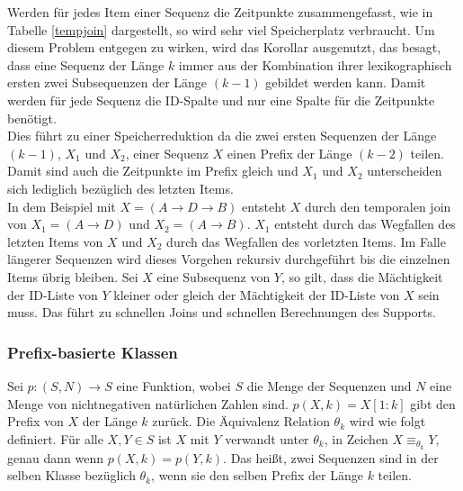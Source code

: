 Werden für jedes Item einer Sequenz die Zeitpunkte zusammengefasst, wie in Tabelle \ref{tempjoin} dargestellt, so wird sehr viel Speicherplatz verbraucht. Um diesem Problem entgegen zu wirken, wird das Korollar ausgenutzt, das besagt, dass eine Sequenz der Länge $k$ immer aus der Kombination ihrer lexikographisch ersten zwei Subsequenzen der Länge $(k-1)$ gebildet werden kann. Damit werden für jede Sequenz die ID-Spalte und nur eine Spalte für die Zeitpunkte benötigt.\\
Dies führt zu einer Speicherreduktion da die zwei ersten Sequenzen der Länge $(k-1)$, $X_1$ und $X_2$, einer Sequenz $X$ einen Prefix der Länge $(k-2)$ teilen. Damit sind auch die Zeitpunkte im Prefix gleich und $X_1$ und $X_2$ unterscheiden sich lediglich bezüglich des letzten Items.\\
In dem Beispiel mit $X=(A\rightarrow D\rightarrow B)$ entsteht $X$ durch den temporalen join von $X_1=(A\rightarrow D)$ und $X_2=(A\rightarrow B)$. $X_1$ entsteht durch das Wegfallen des letzten Items von $X$ und $X_2$ durch das Wegfallen des vorletzten Items. Im Falle längerer Sequenzen wird dieses Vorgehen rekursiv durchgeführt bis die einzelnen Items übrig bleiben. Sei $X$ eine Subsequenz von $Y$, so gilt, dass die Mächtigkeit der ID-Liste von $Y$ kleiner oder gleich der Mächtigkeit der ID-Liste von $X$ sein muss. Das führt zu schnellen Joins und schnellen Berechnungen des Supports.

\subsubsection*{Prefix-basierte Klassen}
Sei $p:(S,N)\rightarrow S$ eine Funktion, wobei $S$ die Menge der Sequenzen und $N$ eine Menge von nichtnegativen natürlichen Zahlen sind. $p(X,k)=X[1:k]$ gibt den Prefix von $X$ der Länge $k$ zurück. Die Äquivalenz Relation $\theta_k$ wird wie folgt definiert. Für alle $X,Y \in S$ ist $X$ mit $Y$ verwandt unter $\theta_k$, in Zeichen $X\equiv_{\theta_k} Y$, genau dann wenn $p(X,k)=p(Y,k)$. Das heißt, zwei Sequenzen sind in der selben Klasse bezüglich $\theta_k$, wenn sie den selben Prefix der Länge $k$ teilen.

